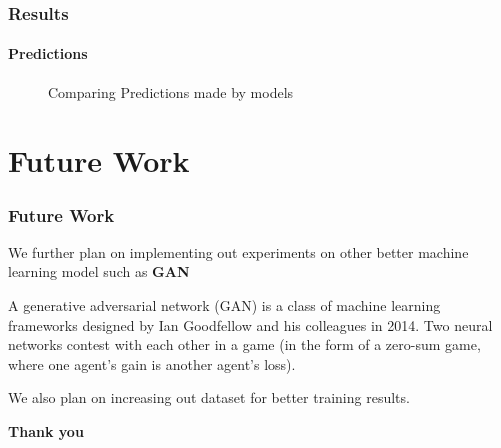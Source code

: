 \documentclass[10pt, aspectratio=169]{beamer}
\begin{document}
	\begin{frame}
		\frametitle{Results}
		\framesubtitle{Predictions}

		\begin{figure}[H]
			\centering
			\hspace{0.3cm}
			\caption{Comparing Predictions made by models}
			\label{fig:Results_Comparison}
		\end{figure}
	\end{frame}

	\section{Future Work}
	\begin{frame}
		\frametitle{Future Work}

		We further plan on implementing out experiments on other better machine
		learning model such as \textbf{GAN}

		\vspace{0.5cm}

		A generative adversarial network (GAN) is a class of machine learning
		frameworks designed by Ian Goodfellow and his colleagues in 2014. Two
		neural networks contest with each other in a game (in the form of a
		zero-sum game, where one agent's gain is another agent's loss).

		\vspace{0.5cm}

		We also plan on increasing out dataset for better training results.
	\end{frame}

	\begin{frame}
		\centering
		\textbf{\Huge Thank you}
	\end{frame}
\end{document}
